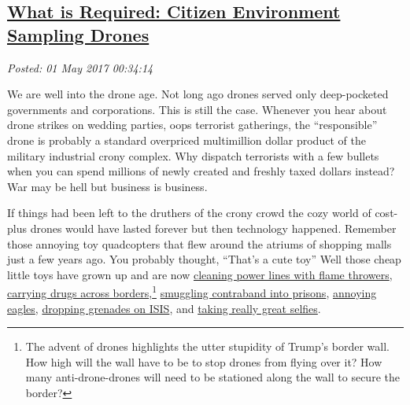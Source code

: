 %

\subsection*{\href{http://analyzethedatanotthedrivel.org/2017/04/30/what-is-required-citizen-environment-sampling-drones/}{What is Required: Citizen Environment Sampling Drones}}


\noindent\emph{Posted: 01 May 2017 00:34:14}
\vspace{6pt}

We are well into the drone age. Not long ago drones served only
deep-pocketed governments and corporations. This is still the case.
Whenever you hear about drone strikes on wedding parties, oops terrorist
gatherings, the ``responsible'' drone is probably a standard overpriced
multimillion dollar product of the military industrial crony complex.
Why dispatch terrorists with a few bullets when you can spend millions
of newly created and freshly taxed dollars instead? War may be hell but
business is business.

If things had been left to the druthers of the crony crowd the cozy
world of cost-plus drones would have lasted forever but then technology
happened. Remember those annoying toy quadcopters that flew around the
atriums of shopping malls just a few years ago. You probably thought,
``That's a cute toy'' Well those cheap little toys have grown up and are
now
\href{http://www.popularmechanics.com/flight/drones/a25282/flame-throwing-drones/}{cleaning
power lines with flame throwers},
\href{http://dailycaller.com/2016/03/30/narco-drones-the-cartels-newest-tech-savvy-smuggling-sop-spooks-security-experts/}{carrying
drugs across borders},\footnote{The advent of drones highlights the utter stupidity of Trump's border
wall. How high will the wall have to be to stop drones from flying
over it? How many anti-drone-drones will need to be stationed along
the wall to secure the border?} %
\href{https://www.washingtonpost.com/local/prisons-try-to-stop-drones-from-delivering-drugs-porn-and-cellphones-to-inmates/2016/10/12/645fb102-800c-11e6-8d0c-fb6c00c90481_story.html}{smuggling
contraband into prisons},
\href{https://www.youtube.com/watch?v=vdgvlHH3JSA}{annoying eagles},
\href{http://nypost.com/2017/03/16/war-against-isis-now-involves-shuttlecock-grenades-dropped-by-drones/}{dropping
grenades on ISIS}, and
\href{https://www.youtube.com/watch?v=FZOgy5V9imI}{taking really great
selfies}.


